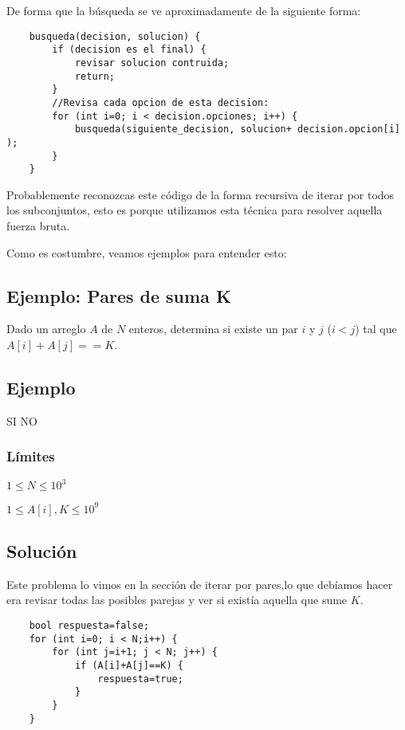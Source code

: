 De forma que la búsqueda se ve aproximadamente de la siguiente forma:

\begin{lstlisting}
	busqueda(decision, solucion) {
		if (decision es el final) {
			revisar solucion contruida;
			return;
		}		
		//Revisa cada opcion de esta decision:
		for (int i=0; i < decision.opciones; i++) {
			busqueda(siguiente_decision, solucion+ decision.opcion[i] );
		}
	}
\end{lstlisting}

Probablemente reconozcas este código de la forma recursiva de iterar por todos los subconjuntos, esto es porque utilizamos esta técnica para resolver aquella fuerza bruta.

Como es costumbre, veamos ejemplos para entender esto:
\subsection{Ejemplo: Pares de suma K}
Dado un arreglo \(A\) de \(N\) enteros, determina si existe un par \(i\) y \(j\) (\(i<j\)) tal que \(A[i]+A[j]==K\).

\subsection*{Ejemplo}
\begin{casebox2}
	{SI}
	 {
		NO
	}
	
\end{casebox2}
\subsubsection*{Límites}
\begin{plimits}
	\item \(1\leq N \leq 10^3\)
	\item \(1\leq A[i], K \leq 10^9\)
\end{plimits}

\subsection*{Solución}
Este problema lo vimos en la sección de iterar por pares,lo que debíamos hacer era revisar todas las posibles parejas y ver si existía aquella que sume \(K\).

\begin{lstlisting}
	bool respuesta=false;
	for (int i=0; i < N;i++) {
		for (int j=i+1; j < N; j++) {
			if (A[i]+A[j]==K) {
				respuesta=true;
			}
		}
	}
\end{lstlisting}

